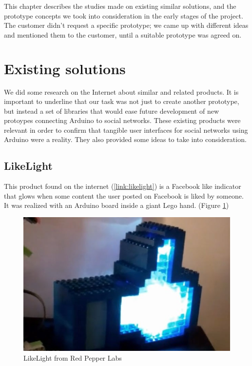 
This chapter describes the studies made on existing similar solutions,
and the prototype concepts we took into consideration in the early stages of the project.
The customer didn't request a specific prototype; we came up with different ideas and mentioned
them to the customer, until a suitable prototype was agreed on.

\section{Existing solutions}
We did some research on the Internet about similar and related products. It is important to underline that our task was
not just to create another prototype, but instead a set of libraries that would ease future development of new protoypes
connecting Arduino to social networks. These existing products were relevant in order to confirm that tangible user interfaces
for social networks using Arduino were a reality. They also provided some ideas to take into consideration.

\newpage

\subsection{LikeLight}
This product found on the internet (\ref{link:likelight}) is a Facebook like indicator that glows when some content the
user posted on Facebook is liked by someone. It was realized with an Arduino board inside a giant Lego hand.
(Figure \ref{fig:prestudies-likehand})

\begin{figure}[h!]
\centering \includegraphics[scale=0.85]{img/prestudies-likehand}
\caption{LikeLight from Red Pepper Labs\cite{link:likelight}}
\label{fig:prestudies-likehand}
\end{figure}

